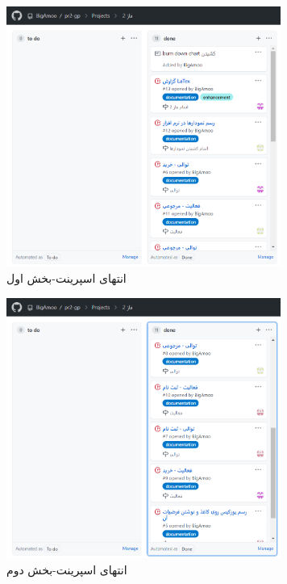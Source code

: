 \documentclass[12pt,a4paper]{article}
\begin{document}
	\begin{figure}[h!]
		\begin{center}
			\includegraphics[width=9cm]{images/screenshot_4.png}
		\end{center}
		\caption{انتهای اسپرینت-بخش اول}
	\end{figure}
		\begin{figure}[h!]
		\begin{center}
			\includegraphics[width=9cm]{images/screenshot_5.png}	
		\end{center}
		\caption{انتهای اسپرینت-بخش دوم}
	\end{figure}
	
\end{document}
